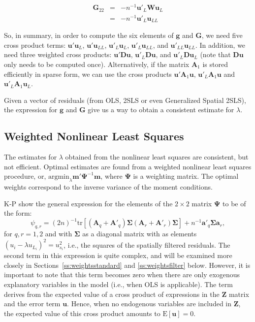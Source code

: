 \documentclass{article}
\begin{document}
\begin{eqnarray}
 \mathbf{G}_{22} &=& - n^{-1} \mathbf{u'}_L \mathbf{W} \mathbf{u}_L \label{eq:G22}\\
    &=& - n^{-1} \mathbf{u'}_L \mathbf{u}_{LL}\nonumber
\end{eqnarray}

So, in summary, in order to compute the six elements of $\mathbf{g}$ and $\mathbf{G}$,
we need five cross product terms: $\mathbf{u'} \mathbf{u}_L$, $\mathbf{u'} \mathbf{u}_{LL}$,
$\mathbf{u'}_L \mathbf{u}_L$, $\mathbf{u'}_L \mathbf{u}_{LL}$, and
$\mathbf{u'}_{LL} \mathbf{u}_{LL}$. In addition, we need three weighted cross products:
$\mathbf{u'} \mathbf{D} \mathbf{u}$, $\mathbf{u'}_L \mathbf{D} \mathbf{u}$, and
$\mathbf{u'}_L \mathbf{D} \mathbf{u}_L$ (note that $\mathbf{Du}$ only needs to be
computed once). Alternatively, if the matrix $\mathbf{A}_1$ is stored efficiently in sparse form,
we can use the cross products $\mathbf{u'}\mathbf{A}_1 \mathbf{u}$, $\mathbf{u'}_L \mathbf{A}_1 \mathbf{u}$ and $\mathbf{u'}_L \mathbf{A}_1 \mathbf{u}_L$.

Given a vector of residuals (from OLS, 2SLS or even Generalized Spatial 2SLS), the expression
for $\mathbf{g}$ and $\mathbf{G}$ give us a way to obtain a consistent estimate for $\lambda$.

\subsection{Weighted Nonlinear Least Squares}\label{ss:weightedgmm}
The estimates for $\lambda$ obtained from the nonlinear least squares are consistent,
but not efficient. Optimal estimates are found from a weighted nonlinear least squares
procedure, or, $\mbox{argmin}_\lambda \mathbf{m'}\mathbf{\mathbf{\Psi}}^{-1} \mathbf{m}$, where $\mathbf{\Psi}$ is a weighting matrix.
The optimal weights correspond to the inverse variance of the moment conditions.

K-P show the general expression for the elements of the $2 \times 2$ matrix $\mathbf{\Psi}$ to
be of the form:
\begin{equation}\label{eq:psiqr}
\psi_{q,r} = (2n)^{-1} \mbox{tr} [ (\mathbf{A}_q + \mathbf{A'}_q ) \mathbf{\mathbf{\Sigma}}  (\mathbf{A}_r + \mathbf{A'}_r ) \mathbf{\Sigma} ] + n^{-1} \mathbf{a'}_q \mathbf{\Sigma} \mathbf{a}_r,
\end{equation}
for $q, r = 1,2$ and with $\mathbf{\Sigma}$ as a diagonal matrix with as elements 
$(u_i - \lambda u_{L_i})^2 = u_{s_i}^2$, i.e., the squares of the spatially filtered residuals.
The second term in this expression is quite complex, and will be examined more closely 
in Sections~\ref{ss:weightsstandard} and \ref{ss:weightsfilter} below.
However, it is important to note that this term becomes zero when there are only exogenous
explanatory variables in the model (i.e., when OLS is applicable). The term derives from the
expected value of a cross
product of expressions in the $\mathbf{Z}$ matrix and the error term $\mathbf{u}$. Hence,
when no endogenous variables are included in $\mathbf{Z}$, the expected value of this
cross product amounts to $\mbox{E}[ \mathbf{u} ] = 0$.
\end{document}
